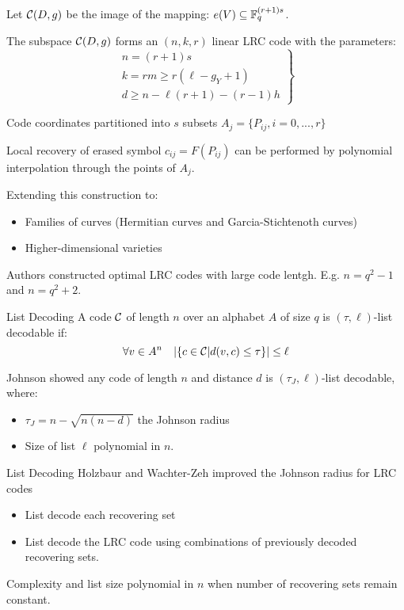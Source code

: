\begin{frame}
    Let $\mathcal{C}(D,g)$ be the image of the mapping: $e(V) \subseteq \mathbb{F}_q^{(r+1)s}$.
    \begin{theorem}
        The subspace $\mathcal{C}(D,g)$ forms an $(n,k,r)$ linear LRC code with the parameters:
        $$        
        \left.                
        \begin{matrix}
        n = (r+1)s \\
        k = rm \geq r(\ell - g_Y + 1) \\
        d \geq n - \ell ( r+1) - (r-1)h
        \end{matrix}                
        \right\rbrace
        $$
    \end{theorem}
    Code coordinates partitioned into $s$ subsets $A_j = \{P_{ij}, i = 0, ..., r\}$
    
    Local recovery of erased symbol $c_{ij} = F(P_{ij})$ can be performed by polynomial interpolation through the points of $A_j$.
\end{frame}

\begin{frame}
    Extending this construction to:
    \begin{itemize}
    \item Families of curves (Hermitian curves and Garcia-Stichtenoth curves)
    \item Higher-dimensional varieties
    \end{itemize}
    Authors constructed optimal LRC codes with large code lentgh. E.g. $n=q^2-1$ and $n=q^2+2$.
\end{frame}

\begin{frame}{List Decoding}
A code $\mathcal{C}$ of length $n$ over an alphabet $A$ of size $q$ is $(\tau, \ell)$-list decodable if:
$$\forall v \in A^n \quad \vert \{ c \in \mathcal{C} \vert d(v,c) \leq \tau \} \vert \leq \ell $$

Johnson showed any code of length $n$ and distance $d$ is $(\tau_J, \ell)$-list decodable, where:
\begin{itemize}
\item $\tau_J = n - \sqrt{n(n-d)}$ the Johnson radius
\item Size of list $\ell$ polynomial in $n$.
\end{itemize}
\end{frame}
\begin{frame}{List Decoding}
Holzbaur and Wachter-Zeh improved the Johnson radius for LRC codes
\begin{itemize}
\item List decode each recovering set 
\item List decode the LRC code using combinations of previously decoded recovering sets.
\end{itemize}

Complexity and list size polynomial in $n$ when number of recovering sets remain constant.

\end{frame}